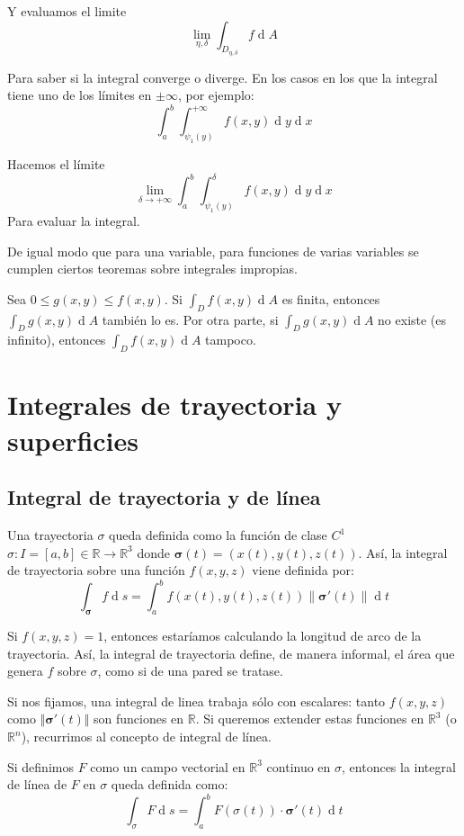 \documentclass[a4paper]{article}
\renewcommand{\d}[1]{\ensuremath{\operatorname{d}\!{#1}}}
\begin{document}
Y evaluamos el limite 
\[ \lim_{\eta,\delta} \int_{D_{\eta,\delta}} f \d{A} \]

Para saber si la integral converge o diverge. En los casos en los que la integral tiene uno de los límites en $\pm \infty$, por ejemplo:
\[\int_a^b\int_{\psi_{ 1 }(y)}^{+\infty} f(x,y) \d{y}\d{x} \]

Hacemos el límite
\[ \lim_{\delta \rightarrow +\infty} \int_a^b\int_{\psi_{ 1 }(y)}^{\delta} f(x,y) \d{y}\d{x}\]
Para evaluar la integral.

De igual modo que para una variable, para funciones de varias variables se cumplen ciertos teoremas sobre integrales impropias.

Sea $0 \le g(x,y) \le f(x,y)$. Si $\int_D f(x,y) \d{A}$ es finita, entonces $\int_D g(x,y) \d{A}$ también lo es. Por otra parte, si $\int_D g(x,y) \d{A}$ no existe (es infinito), entonces $\int_D f(x,y) \d{A}$ tampoco.



\section{Integrales de trayectoria y superficies}
\subsection{Integral de trayectoria y de línea}
Una trayectoria $\sigma$ queda definida como la función de clase $C^1$ $\sigma: I = [a,b] \in \mathbb{R} \rightarrow \mathbb{R}^3$ donde $\boldsymbol{\sigma}(t) = (x(t), y(t), z(t))$. Así, la integral de trayectoria sobre una función $f(x,y,z)$ viene definida por:
\[ \int_{\boldsymbol{\sigma}} f \d{s} = \int_a^b f(x(t), y(t), z(t)) \lVert\boldsymbol{\sigma}'(t)\rVert \d{t} \]

Si $f(x,y,z) = 1$, entonces estaríamos calculando la longitud de arco de la trayectoria. Así, la integral de trayectoria define, de manera informal, el área que genera $f$ sobre $\sigma$, como si de una pared se tratase.

Si nos fijamos, una integral de linea trabaja sólo con escalares: tanto $f(x,y,z)$ como $\Vert\boldsymbol{\sigma}'(t)\Vert$ son funciones en $\mathbb{R}$. Si queremos extender estas funciones en $\mathbb{R}^3$ (o $\mathbb{R}^n$), recurrimos al concepto de integral de línea. 

Si definimos $F$ como un campo vectorial en $\mathbb{R}^3$ continuo en $\sigma$, entonces la integral de línea de $F$ en $\sigma$ queda definida como:
\[ \int_\sigma F \d{s} = \int_a^b F(\sigma(t))\cdot \boldsymbol{\sigma}'(t) \d{t} \]
\end{document}
